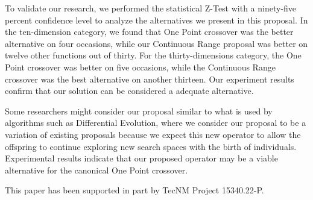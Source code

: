 \documentclass[graybox]{svmult}
\begin{document}
    To validate our research, we performed the statistical Z-Test with a ninety-five percent confidence level to analyze the alternatives we present in this proposal. In the ten-dimension category, we found that One Point crossover was the better alternative on four occasions, while our Continuous Range proposal was better on twelve other functions out of thirty. For the thirty-dimensions category, the One Point crossover was better on five occasions, while the Continuous Range crossover was the best alternative on another thirteen. Our experiment results confirm that our solution can be considered a adequate alternative.

    Some researchers might consider our proposal similar to what is used by algorithms such as Differential Evolution, where we consider our proposal to be a variation of existing proposals because we expect this new operator to allow the offspring to continue exploring new search spaces with the birth of individuals. Experimental results indicate that our proposed operator may be a viable alternative for the canonical One Point crossover.


\begin{acknowledgement}
    This paper has been supported in part by TecNM Project 15340.22-P.
\end{acknowledgement}

%


%

\end{document}
